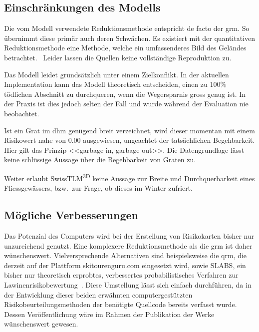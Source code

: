\clearpage

\subsection{Einschränkungen des Modells}
Die vom Modell verwendete Reduktionsmethode entspricht de facto der \acrshort{grm}. So übernimmt diese primär auch deren Schwächen. Es existiert mit der quantitativen Reduktionsmethode eine Methode, welche ein umfassenderes Bild des Geländes betrachtet.~\cite{qrm}
Leider lassen die Quellen keine vollständige Reproduktion zu.

Das Modell leidet grundsätzlich unter einem Zielkonflikt. In der aktuellen Implementation kann das Modell theoretisch entscheiden, einen zu 100\% tödlichen Abschnitt zu durchqueren, wenn die Wegersparnis gross genug ist. In der Praxis ist dies jedoch selten der Fall und wurde während der Evaluation nie beobachtet.

Ist ein Grat im \acrshort{dhm} genügend breit verzeichnet, wird dieser momentan mit einem Risikowert nahe von $0.00$ ausgewiesen, ungeachtet der tatsächlichen Begehbarkeit. Hier gilt das Prinzip <<garbage in, garbage out>>. Die Datengrundlage lässt keine schlüssige Aussage über die Begehbarkeit von Graten zu.

Weiter erlaubt SwissTLM\textsuperscript{3D} keine Aussage zur Breite und Durchquerbarkeit eines Fliessgewässers, bzw.\ zur Frage, ob dieses im Winter zufriert.

\subsection{Mögliche Verbesserungen}\label{sec:improvements}

Das Potenzial des Computers wird bei der Erstellung von Risikokarten bisher nur unzureichend genutzt. Eine komplexere Reduktionsmethode als die \acrshort{grm} ist daher wünschenswert. Vielversprechende Alternativen sind beispielsweise die \gls{qrm}, die derzeit auf der Plattform skitourenguru.com eingesetzt wird, sowie SLABS, ein bisher nur theoretisch erprobtes, verbessertes probabilistisches Verfahren zur Lawinenrisikobewertung~\cite{qrm}\cite{slabs}. Diese Umstellung lässt sich einfach durchführen, da in der Entwicklung dieser beiden erwähnten computergestützten Risikobeurteilungsmethoden der benötigte Quellcode bereits verfasst wurde. Dessen Veröffentlichung wäre im Rahmen der Publikation der Werke wünschenswert gewesen.

